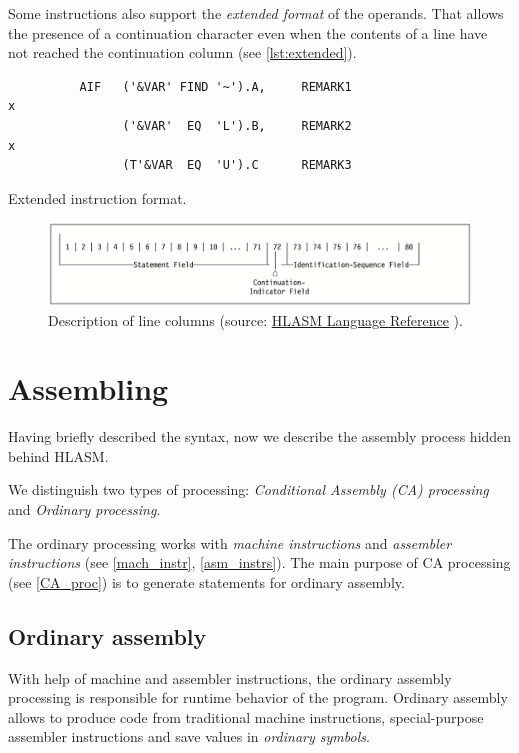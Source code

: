 Some instructions also support the \emph{extended format} of the operands. That allows the presence of a continuation character even when the contents of a line have not reached the continuation column (see \cref{lst:extended}).

\begin{listing}[t]
	\begin{verbatim}
          AIF   ('&VAR' FIND '~').A,     REMARK1                        x
                ('&VAR'  EQ  'L').B,     REMARK2                        x
                (T'&VAR  EQ  'U').C      REMARK3 
	\end{verbatim}
	\caption{Extended instruction format.}
	\label{lst:extended}
\end{listing}

\begin{figure}
	\includegraphics[width=\textwidth]{img/line}
	\caption{Description of line columns (source: \href{https://www-01.ibm.com/servers/resourcelink/svc00100.nsf/pages/zOSV2R3sc264940/$file/asmr1023.pdf}{HLASM Language Reference} ).}
	\label{fig01:line}
\end{figure}


\section{Assembling}
\label{Assembling}

Having briefly described the syntax, now we describe the assembly process hidden behind HLASM. 

We distinguish two types of processing: \emph{Conditional Assembly (CA) processing} and \emph{Ordinary processing}.

The ordinary processing works with \emph{machine instructions} and \emph{assembler instructions} (see \cref{mach_instr}, \cref{asm_instrs}). The main purpose of CA processing (see \cref{CA_proc}) is to generate statements for ordinary assembly.

\subsection{Ordinary assembly}

With help of machine and assembler instructions, the ordinary assembly processing is responsible for runtime behavior of the program. Ordinary assembly allows to produce code from traditional machine instructions, special-purpose assembler instructions and save values in \emph{ordinary symbols}.

